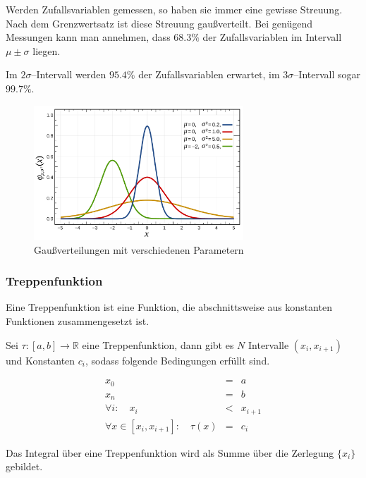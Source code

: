 \documentclass[12pt,a4paper]{scrartcl}
\numberwithin{equation}{section} %
\begin{document}
\noindent
Werden Zufallsvariablen gemessen, so haben sie immer eine gewisse Streuung. Nach dem Grenzwertsatz ist diese Streuung gaußverteilt. Bei genügend Messungen kann man annehmen, dass $68.3\%$ der Zufallsvariablen im Intervall $\mu\pm\sigma$ liegen.

Im $2\sigma$--Intervall werden $95.4\%$ der Zufallsvariablen erwartet, im $3\sigma$--Intervall sogar $99.7\%$.

\begin{figure}[h]
	\centering
	\includegraphics[width=0.7\textwidth]{../media/B1.1/Gaussverteilungen.pdf}
	\caption{Gaußverteilungen mit verschiedenen Parametern \cite{abb:gaussians}}
	\label{abb:gaussians}
\end{figure}

\hypertarget{treppenfunktion}{%
\subsubsection{Treppenfunktion}\label{treppenfunktion}}

Eine Treppenfunktion ist eine Funktion, die abschnittsweise aus konstanten Funktionen zusammengesetzt ist.

Sei $\tau:[a,b]\rightarrow \mathbb R$ eine Treppenfunktion, dann gibt es $N$ Intervalle $(x_i, x_{i+1})$ und Konstanten $c_i$, sodass folgende Bedingungen erfüllt sind. \cite{Einsiedler}

\begin{eqnarray}
    x_0 &=& a \\
    x_n &=& b \\
    \forall i:\quad
        x_i &<& x_{i+1} \\
    \forall x\in[x_i, x_{i+1}]:\quad
        \tau(x) &=& c_i
\end{eqnarray}

\noindent
Das Integral über eine Treppenfunktion wird als Summe über die Zerlegung $\{x_i\}$ gebildet.
\end{document}
